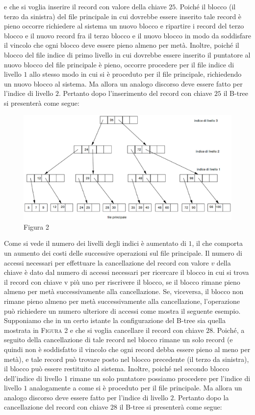 e che si voglia inserire il record con valore della chiave $25$. Poiché il blocco (il terzo da sinistra) del
file principale in cui dovrebbe essere inserito tale record è pieno occorre richiedere al sistema un
nuovo blocco e ripartire i record del terzo blocco e il nuovo record fra il terzo blocco e il nuovo
blocco in modo da soddisfare il vincolo che ogni blocco deve essere pieno almeno per metà. Inoltre,
poiché il blocco del file indice di primo livello in cui dovrebbe essere inserito il puntatore al nuovo
blocco del file principale è pieno, occorre procedere per il file indice di livello $1$ allo stesso modo in
cui si è proceduto per il file principale, richiedendo un nuovo blocco al sistema. Ma allora un
analogo discorso deve essere fatto per l'indice di livello $2$. Pertanto dopo l'inserimento del record
con chiave $25$ il B-tree si presenterà come segue:

\begin{figure}[h!]
  \centering
  \includegraphics[width=430px]{img_5_3_4(2).eps}
  Figura 2
\end{figure}

Come si vede il numero dei livelli degli indici è aumentato di $1$, il che comporta un aumento dei
costi delle successive operazioni sul file principale.
Il numero di accessi necessari per effettuare la cancellazione del record con valore $v$ della chiave è
dato dal numero di accessi necessari per ricercare il blocco in cui si trova il record con chiave v più
uno per riscrivere il blocco, se il blocco rimane pieno almeno per metà successivamente alla
cancellazione. Se, viceversa, il blocco non rimane pieno almeno per metà successivamente alla
cancellazione, l'operazione può richiedere un numero ulteriore di accessi come mostra il seguente
esempio.\\
Supponiamo che in un certo istante la configurazione del B-tree sia quella mostrata in \textsc{Figura 2} e che si
voglia cancellare il record con chiave $28$. Poiché, a seguito della cancellazione di tale record nel
blocco rimane un solo record (e quindi non è soddisfatto il vincolo che ogni record debba essere
pieno al meno per metà), e tale record può trovare posto nel blocco precedente (il terzo da sinistra),
il blocco può essere restituito al sistema. Inoltre, poiché nel secondo blocco dell'indice di livello 1
rimane un solo puntatore possiamo procedere per l'indice di livello $1$ analogamente a come si è
proceduto per il file principale. Ma allora un analogo discorso deve essere fatto per l'indice di
livello $2$. Pertanto dopo la cancellazione del record con chiave $28$ il B-tree si presenterà come segue:

